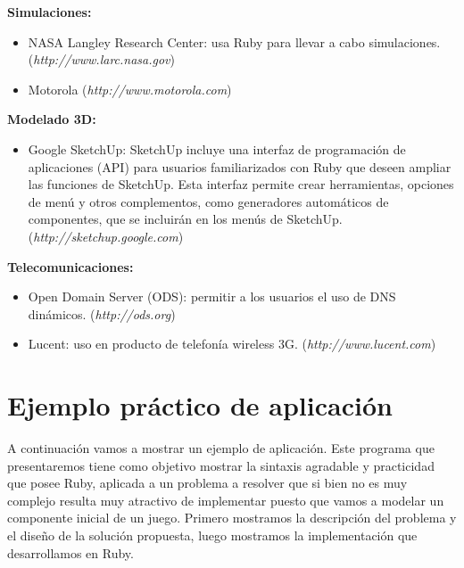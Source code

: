 \documentclass{article}
\begin{document}
\textbf{Simulaciones:}
\begin{itemize}
	\itemsep=1pt \topsep=0pt \partopsep=0pt \parskip=0pt \parsep=0pt
	\item NASA Langley Research Center: usa Ruby para llevar a cabo simulaciones. (\textit{http://www.larc.nasa.gov})
	\item Motorola (\textit{http://www.motorola.com})
\end{itemize}
\medskip

\textbf{Modelado 3D:}
\begin{itemize}
	\itemsep=1pt \topsep=0pt \partopsep=0pt \parskip=0pt \parsep=0pt
	\item Google SketchUp: SketchUp incluye una interfaz de programación de aplicaciones (API) para usuarios familiarizados con Ruby que deseen ampliar las funciones de SketchUp. Esta interfaz permite crear herramientas, opciones de menú y otros complementos, como generadores automáticos de componentes, que se incluirán en los menús de SketchUp. (\textit{http://sketchup.google.com})
\end{itemize}
\medskip

\textbf{Telecomunicaciones:}
\begin{itemize}
	\itemsep=1pt \topsep=0pt \partopsep=0pt \parskip=0pt \parsep=0pt
	\item Open Domain Server (ODS): permitir a los usuarios el uso de DNS dinámicos. (\textit{http://ods.org})
	\item Lucent: uso en producto de telefonía wireless 3G. (\textit{http://www.lucent.com})
\end{itemize}
\medskip
\bigskip




\section{Ejemplo práctico de aplicación}

	A continuación vamos a mostrar un ejemplo de aplicación. Este programa que presentaremos tiene como objetivo mostrar la sintaxis agradable y practicidad que posee Ruby, aplicada a un problema a resolver que si bien no es muy complejo resulta muy atractivo de implementar puesto que vamos a modelar un componente inicial de un juego. Primero mostramos la descripción del problema y el diseño de la solución propuesta, luego mostramos la implementación que desarrollamos en Ruby.
\bigskip
\end{document}
